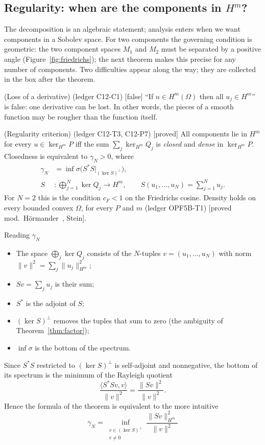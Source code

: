 \documentclass[11pt,a4paper]{article}
\theoremstyle{definition}
\newcommand{\badge}[2]{\textcolor{#1}{\textsf{\footnotesize[#2]}}}
\newcommand{\proved}[1][]{\badge{cC}{proved#1}}
\newcommand{\modulo}[1]{\badge{cD}{proved mod.\ #1}}
\newcommand{\falsest}{\badge{cB}{false}}
\newcommand{\led}[1]{\textcolor{cG}{\textsf{\footnotesize(ledger #1)}}}
\begin{document}
\subsection{Regularity: when are the components in $H^m$?}
The decomposition is an algebraic statement; analysis enters when we want components in a Sobolev space. For two components the governing condition is geometric: the two component spaces $M_1$ and $M_2$ must be separated by a positive angle (Figure~\ref{fig:friedrichs}); the next theorem makes this precise for any number of components. Two difficulties appear along the way; they are collected in the box after the theorem.
\begin{proposition}{(Loss of a derivative) \led{C12-C1} \falsest}\label{prop:loss}
``If $u\in H^m(\Omega)$ then all $u_j\in H^m$'' is false: one derivative can be lost. In other words, the pieces of a smooth function may be rougher than the function itself.
\end{proposition}
\begin{theorem}{(Regularity criterion) \led{C12-T3, C12-P7} \proved[]}\label{thm:hm}
All components lie in $H^m$ for every $u\in\ker_{H^m}P$ iff the sum $\sum_j\ker_{H^m}Q_j$ is \emph{closed} and \emph{dense} in $\ker_{H^m}P$. Closedness is equivalent to $\gamma_N>0$, where
\[
\begin{aligned}
\gamma_N&=\inf\sigma\big(S^*S\big|_{(\ker S)^\perp}\big),\\
S&:\bigoplus_{j=1}^N\ker Q_j\to H^m,\qquad S(u_1,\dots,u_N)=\sum_{j=1}^Nu_j .
\end{aligned}
\]
For $N=2$ this is the condition $c_F<1$ on the Friedrichs cosine. Density holds on every bounded convex $\Omega$, for every $P$ and $m$ \led{OPF5B-T1} \modulo{H\"ormander~\cite{ho}, Stein}.
\end{theorem}
\begin{notebox}{Reading $\gamma_N$}
\begin{itemize}[nosep]
\item The space $\bigoplus_j\ker Q_j$ consists of the $N$-tuples $v=(u_1,\dots,u_N)$ with norm $\|v\|^2=\sum_j\|u_j\|_{H^m}^2$;
\item $Sv=\sum_ju_j$ is their sum;
\item $S^*$ is the adjoint of $S$;
\item $(\ker S)^\perp$ removes the tuples that sum to zero (the ambiguity of Theorem~\ref{thm:factor});
\item $\inf\sigma$ is the bottom of the spectrum.
\end{itemize}
Since $S^*S$ restricted to $(\ker S)^\perp$ is self-adjoint and nonnegative, the bottom of its spectrum is the minimum of the Rayleigh quotient
\[
\frac{\langle S^*Sv,v\rangle}{\|v\|^2}=\frac{\|Sv\|^2}{\|v\|^2}.
\]
Hence the formula of the theorem is equivalent to the more intuitive
\[
\boxed{\ \gamma_N=\inf_{\substack{v\in(\ker S)^\perp\\ v\ne0}}\frac{\|Sv\|_{H^m}^2}{\|v\|^2}\ }
\]
\end{notebox}
\end{document}
